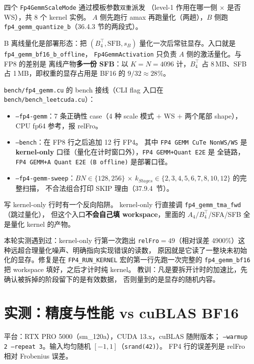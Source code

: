 四个 \texttt{Fp4GemmScaleMode} 通过模板参数\texttt{双重}派发
（level-1 作用在哪一侧 $\times$ 是否 WS），共 8 个 kernel 实例。
$A$ 侧先跑行 amax 再跑量化（两趟），$B$ 侧跑
\texttt{fp4\_gemm\_quantize\_b}（36.4.3 节的两段式）。

B 离线量化是部署形态：把
$(B_4^{\top}, \mathrm{SFB}, s_B)$ 量化一次后常驻显存。入口就是
\texttt{fp4\_gemm\_bf16\_b\_offline}，
\texttt{Fp4GemmActivation} 只负责 $A$ 侧的激活量化。与 FP8 的差别是
离线产物\textbf{多一份 SFB}：以 $K{=}N{=}4096$ 计，$B_4^{\top}$ 占
8\,MB、SFB 占 1\,MB，即权重的显存占用是 BF16 的
$9/32\approx28\%$。

\texttt{bench/fp4\_gemm.cu} 的 bench 接线（CLI flag 入口在 \texttt{bench/bench\_leetcuda.cu}）：

\begin{itemize}[itemsep=2pt,topsep=3pt]
  \item \texttt{--fp4-gemm}：7 条正确性 case（4 种 scale 模式 $+$ WS
        $+$ 两个尾部 shape），CPU fp64 参考，报 relFro。
  \item \texttt{--bench}：在 FP8 行之后追加 12 行 FP4。
        其中 \texttt{FP4 GEMM CuTe NonWS/WS} 是 \textbf{kernel-only}
        口径（量化在计时窗口外），\texttt{FP4 GEMM+Quant E2E} 是
        全链路，\texttt{FP4 GEMM+A Quant E2E (B offline)} 是部署口径。
  \item \texttt{--fp4-gemm-sweep}：$BN\in\{128,256\}$ $\times$
        $k_{Stages}\in\{2,3,4,5,6,7,8,10,12\}$ 的完整扫描，
        不合法组合打印 SKIP 理由（37.9.4~节）。
\end{itemize}

写 kernel-only 行时有一个反向陷阱。
kernel-only 行直接调 \texttt{fp4\_gemm\_tma\_fwd}（跳过量化），
但这个入口\textbf{不会自己填 workspace}，里面的
$A_4/B_4^{\top}$/SFA/SFB 全是量化 kernel 的产物。

本轮实测遇到过：kernel-only 行第一次跑出
\texttt{relFro}$=49$（相对误差 4900\%）这种远超合理量化噪声、明确指向实现错误的读数，
原因就是它读了一整块未初始化的显存。修复是在
\texttt{FP4\_RUN\_KERNEL} 宏的第一行先跑一次完整的
\texttt{fp4\_gemm\_bf16} 把 workspace 填好，之后才计时纯 kernel。
教训：凡是要拆开计时的加速比，先确认被拆掉的阶段留下的是有效数据，
否则量到的是显存的随机内容。

\section{实测：精度与性能 vs cuBLAS BF16}\label{sec:37-perf}

平台：RTX PRO 5000（sm\_120a），CUDA 13.x，cuBLAS 随附版本；
\texttt{--warmup 2 --repeat 3}。输入均匀随机 $[-1,1]$（\texttt{srand(42)}）。
FP4 行的误差列是 relFro 相对 Frobenius 误差。

